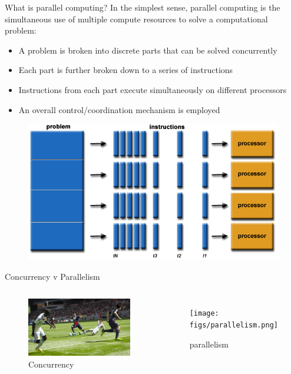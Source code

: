 \documentclass[10pt,times]{beamer}
\begin{document}
\begin{frame}{What is parallel computing?}
In the simplest sense, parallel computing is the simultaneous use of multiple 
compute resources to solve a computational problem:
\begin{itemize}
\item A problem is broken into discrete parts that can be solved concurrently
\item Each part is further broken down to a series of instructions
\item Instructions from each part execute simultaneously on different processors
\item An overall control/coordination mechanism is employed 
\end{itemize}
\begin{figure}
\includegraphics[width=0.7\linewidth]{figs/parallel_problem.png}
\caption*{}
\end{figure}
\end{frame}

\begin{frame}{Concurrency v Parallelism}
\begin{columns}
\begin{figure}
\includegraphics[width=\linewidth]{figs/concurrency.png}
\caption*{Concurrency}
\end{figure}
\begin{figure}
\texttt{[image: figs/parallelism.png]}
\caption*{parallelism}
\end{figure}
\end{columns}
\end{frame}
\end{document}
